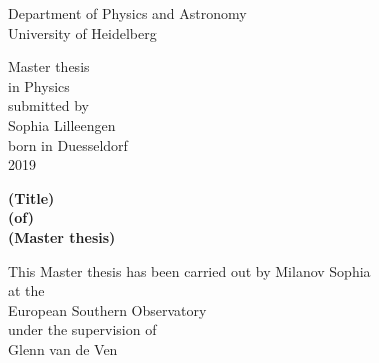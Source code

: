 
\begin{titlepage}
\begin{center}
  \renewcommand{\baselinestretch}{2.00}
  \Large\sffamily
  Department of Physics and Astronomy\\
  \large University of Heidelberg
  \par\vfill\normalfont
  Master thesis\\
  in Physics\\
  submitted by\\
  Sophia Lilleengen\\
  born in Duesseldorf\\
  2019
\end{center}
\newpage

\begin{center}
  \renewcommand{\baselinestretch}{2.00}
  \Large\bfseries\sffamily
    (Title)\\
    (of)\\
    (Master thesis)
  \par
  \vfill
  \large\normalfont
  This Master thesis has been carried out by Milanov Sophia\\
  at the\\
  European Southern Observatory\\
  under the supervision of\\
  Glenn van de Ven
\end{center}\par
\vspace{5\baselineskip}

\renewcommand{\baselinestretch}{1.00}\normalsize
\end{titlepage}
